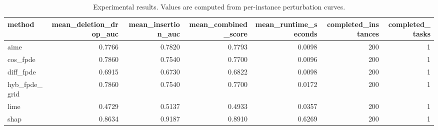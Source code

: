 \begin{table}[t]
\caption{Experimental results. Values are computed from per-instance perturbation curves.}
\label{tab:main_results_computed}
\centering
\begin{tabular}{lrrrrrr}
\toprule
method & mean\_deletion\_drop\_auc & mean\_insertion\_auc & mean\_combined\_score & mean\_runtime\_seconds & completed\_instances & completed\_tasks \\
\midrule
aime & 0.7766 & 0.7820 & 0.7793 & 0.0098 & 200 & 1 \\
cos\_fpde & 0.7860 & 0.7540 & 0.7700 & 0.0096 & 200 & 1 \\
diff\_fpde & 0.6915 & 0.6730 & 0.6822 & 0.0098 & 200 & 1 \\
hyb\_fpde\_grid & 0.7860 & 0.7540 & 0.7700 & 0.0172 & 200 & 1 \\
lime & 0.4729 & 0.5137 & 0.4933 & 0.0357 & 200 & 1 \\
shap & 0.8634 & 0.9187 & 0.8910 & 0.6269 & 200 & 1 \\
\bottomrule
\end{tabular}

\end{table}
